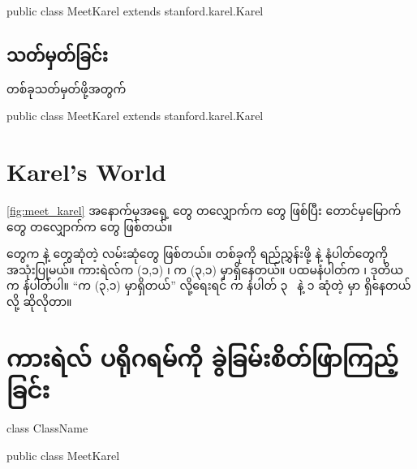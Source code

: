 \begin{sloppypar}
\begin{lstcodesimple}[caption=\myttlcode{class} သတ်မှတ်သည့် ဆင်းတက်စ်]
    public class MeetKarel extends stanford.karel.Karel{
            
    }
\end{lstcodesimple}

\subsection{ သတ်မှတ်ခြင်း}
 တစ်ခုသတ်မှတ်ဖို့အတွက် 

\begin{lstcodesimple}[caption=\myttlcode{class} သတ်မှတ်သည့် ဆင်းတက်စ်]
    public class MeetKarel extends stanford.karel.Karel{
            
    }
\end{lstcodesimple}

\section{Karel's World}
\Fig \vref*{fig:meet_karel} 
အနောက်မှအရှေ့ \mmcorner တွေ တလျှောက်က \enstreet တွေ ဖြစ်ပြီး တောင်မှမြောက် \mmcorner တွေ တလျှောက်က \enavenue တွေ ဖြစ်တယ်။ 

\mmcorner တွေက \mmavenue နဲ့ \mmstreet တွေဆုံတဲ့ လမ်းဆုံတွေ ဖြစ်တယ်။ \mmcorner တစ်ခုကို ရည်ညွှန်းဖို့ \mmavenue နဲ့ \mmstreet နံပါတ်‌တွေကို အသုံးပြုမယ်။ ကားရဲလ်က (၁,၁) \mmcorner၊ \mmbeeper က (၃,၁) \mmcorner မှာရှိနေတယ်။ ပထမ‌‌နံပါတ်က \mmavenue ၊ ဒုတိယက \mmstreet နံပါတ်ပါ။ “\mmbeeper က (၃,၁) \mmcorner မှာရှိတယ်”  လို့ရေးရင် \mmbeeper က နံပါတ် ၃ \mmavenue\ နဲ့ ၁ \mmstreet ဆုံတဲ့ \mmcorner မှာ ရှိနေတယ်လို့ ဆိုလိုတာ။



\section{ကားရဲလ် ပရိုဂရမ်ကို ခွဲခြမ်းစိတ်ဖြာကြည့်ခြင်း}

\begin{lstcodesimple}[language = Java, float=ht]
    class ClassName {
            
    }
\end{lstcodesimple}

\begin{lstcodesimple}[language = Java, float]
    public class MeetKarel{
            
    }
\end{lstcodesimple}


\end{sloppypar}
